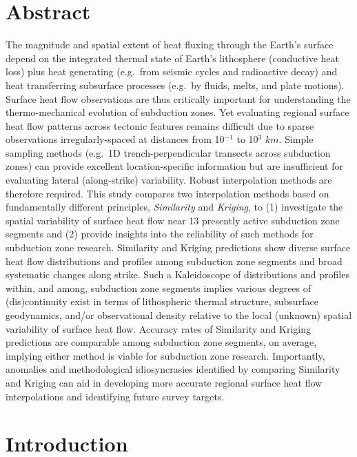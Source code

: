
\hypertarget{chpt3Abstract}{%
\section{Abstract}\label{chpt3Abstract}}

The magnitude and spatial extent of heat fluxing through the Earth's surface depend on the integrated thermal state of Earth's lithosphere (conductive heat loss) plus heat generating (e.g.~from seismic cycles and radioactive decay) and heat transferring subsurface processes (e.g.~by fluids, melts, and plate motions). Surface heat flow observations are thus critically important for understanding the thermo-mechanical evolution of subduction zones. Yet evaluating regional surface heat flow patterns across tectonic features remains difficult due to sparse observations irregularly-spaced at distances from 10\(^{-1}\) to 10\(^3\) \(km\). Simple sampling methods (e.g.~1D trench-perpendicular transects across subduction zones) can provide excellent location-specific information but are insufficient for evaluating lateral (along-strike) variability. Robust interpolation methods are therefore required. This study compares two interpolation methods based on fundamentally different principles, \emph{Similarity} and \emph{Kriging}, to (1) investigate the spatial variability of surface heat flow near 13 presently active subduction zone segments and (2) provide insights into the reliability of such methods for subduction zone research. Similarity and Kriging predictions show diverse surface heat flow distributions and profiles among subduction zone segments and broad systematic changes along strike. Such a Kaleidoscope of distributions and profiles within, and among, subduction zone segments implies various degrees of (dis)continuity exist in terms of lithospheric thermal structure, subsurface geodynamics, and/or observational density relative to the local (unknown) spatial variability of surface heat flow. Accuracy rates of Similarity and Kriging predictions are comparable among subduction zone segments, on average, implying either method is viable for subduction zone research. Importantly, anomalies and methodological idiosyncrasies identified by comparing Similarity and Kriging can aid in developing more accurate regional surface heat flow interpolations and identifying future survey targets.

\hypertarget{chpt3Intro}{%
\section{Introduction}\label{chpt3Intro}}

